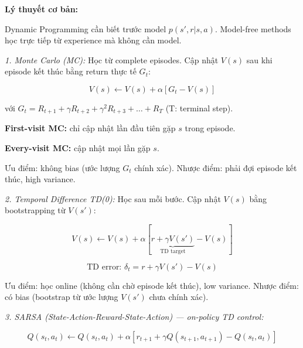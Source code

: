 \documentclass[12pt,a4paper]{article}
\begin{document}
\textbf{Lý thuyết cơ bản:}

Dynamic Programming cần biết trước model $p(s',r|s,a)$. Model-free methods học trực tiếp từ experience mà không cần model.

\textit{1. Monte Carlo (MC):} Học từ complete episodes. Cập nhật $V(s)$ sau khi episode kết thúc bằng return thực tế $G_t$:

\begin{equation}
V(s) \leftarrow V(s) + \alpha [G_t - V(s)]
\end{equation}

với $G_t = R_{t+1} + \gamma R_{t+2} + \gamma^2 R_{t+3} + \ldots + R_T$ (T: terminal step).

\textbf{First-visit MC:} chỉ cập nhật lần đầu tiên gặp $s$ trong episode.

\textbf{Every-visit MC:} cập nhật mọi lần gặp $s$.

Ưu điểm: không bias (ước lượng $G_t$ chính xác). Nhược điểm: phải đợi episode kết thúc, high variance.

\textit{2. Temporal Difference TD(0):} Học sau mỗi bước. Cập nhật $V(s)$ bằng bootstrapping từ $V(s')$:

\begin{equation}
V(s) \leftarrow V(s) + \alpha [\underbrace{r + \gamma V(s')}_{\text{TD target}} - V(s)]
\end{equation}

\begin{equation}
\text{TD error: } \delta_t = r + \gamma V(s') - V(s)
\end{equation}

Ưu điểm: học online (không cần chờ episode kết thúc), low variance. Nhược điểm: có bias (bootstrap từ ước lượng $V(s')$ chưa chính xác).

\textit{3. SARSA (State-Action-Reward-State-Action) --- on-policy TD control:}

\begin{equation}
Q(s_t,a_t) \leftarrow Q(s_t,a_t) + \alpha \left[ r_{t+1} + \gamma Q(s_{t+1}, a_{t+1}) - Q(s_t,a_t) \right]
\end{equation}
\end{document}
